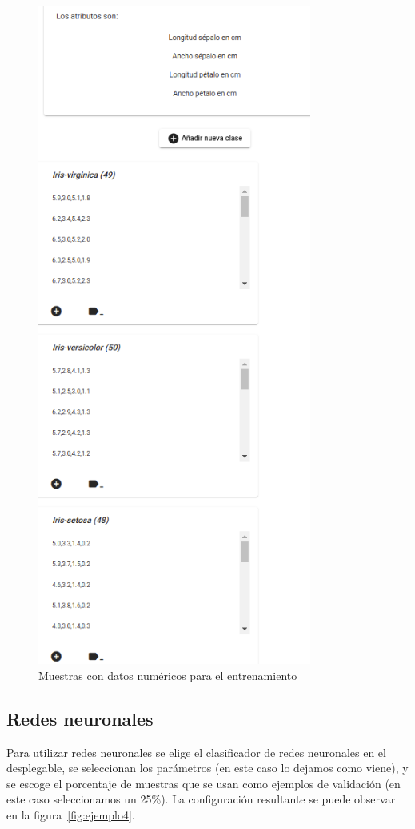 \documentclass[a4paper, 12pt]{book}
\begin{document}
\begin{figure}
	\centering
	\includegraphics[width=9cm, keepaspectratio]{img/ejemplo_muestras_num.png}
	\caption{Muestras con datos numéricos para el entrenamiento} 	\label{fig:ejemplo3}
\end{figure}

\subsection{Redes neuronales}
\label{subsec:redesneuronales}

Para utilizar redes neuronales se elige el clasificador de redes neuronales en el desplegable, se seleccionan los parámetros (en este caso lo dejamos como viene), y se escoge el porcentaje de muestras que se usan como ejemplos de validación (en este caso seleccionamos un 25\%). La configuración resultante se puede observar en la figura~\ref{fig:ejemplo4}.
\end{document}
